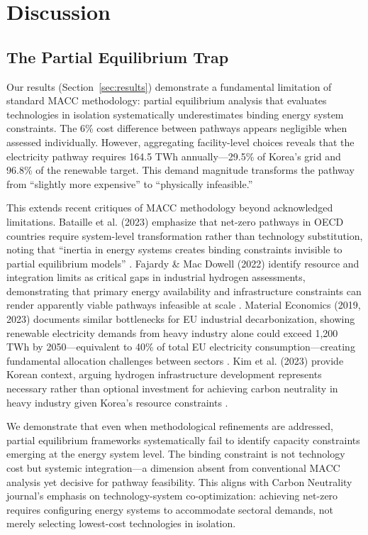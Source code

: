 \documentclass[11pt,a4paper]{article}
\begin{document}
\section{Discussion}
\label{sec:discussion}

\subsection{The Partial Equilibrium Trap}

Our results (Section~\ref{sec:results}) demonstrate a fundamental limitation of standard MACC methodology: partial equilibrium analysis that evaluates technologies in isolation systematically underestimates binding energy system constraints. The 6\% cost difference between pathways appears negligible when assessed individually. However, aggregating facility-level choices reveals that the electricity pathway requires 164.5 TWh annually---29.5\% of Korea's grid and 96.8\% of the renewable target. This demand magnitude transforms the pathway from ``slightly more expensive'' to ``physically infeasible.''

This extends recent critiques of MACC methodology \citep{Kesicki2021} beyond acknowledged limitations. Bataille et al. (2023) emphasize that net-zero pathways in OECD countries require system-level transformation rather than technology substitution, noting that ``inertia in energy systems creates binding constraints invisible to partial equilibrium models'' \citep{Bataille2023}. Fajardy \& Mac Dowell (2022) identify resource and integration limits as critical gaps in industrial hydrogen assessments, demonstrating that primary energy availability and infrastructure constraints can render apparently viable pathways infeasible at scale \citep{Fajardy2022}. Material Economics (2019, 2023) documents similar bottlenecks for EU industrial decarbonization, showing renewable electricity demands from heavy industry alone could exceed 1,200 TWh by 2050---equivalent to 40\% of total EU electricity consumption---creating fundamental allocation challenges between sectors \citep{MaterialEconomics2019,MaterialEconomics2023}. Kim et al. (2023) provide Korean context, arguing hydrogen infrastructure development represents necessary rather than optional investment for achieving carbon neutrality in heavy industry given Korea's resource constraints \citep{Kim2023}.

We demonstrate that even when methodological refinements are addressed, partial equilibrium frameworks systematically fail to identify capacity constraints emerging at the energy system level. The binding constraint is not technology cost but systemic integration---a dimension absent from conventional MACC analysis yet decisive for pathway feasibility. This aligns with Carbon Neutrality journal's emphasis on technology-system co-optimization: achieving net-zero requires configuring energy systems to accommodate sectoral demands, not merely selecting lowest-cost technologies in isolation.
\end{document}
